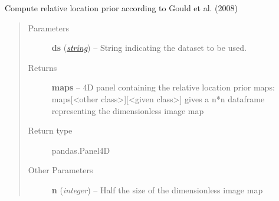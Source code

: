 \documentclass[letterpaper,10pt,english]{sphinxmanual}
\begin{document}
\begin{fulllineitems}
\label{classification:flamingo.classification.features.relativelocation.compute_prior}
Compute relative location prior according to Gould et al. (2008)
\begin{quote}\begin{description}
\item[{Parameters}] \leavevmode
\textbf{ds} (\href{http://docs.python.org/library/string.html\#module-string}{\emph{string}}) -- String indicating the dataset to be used.

\item[{Returns}] \leavevmode
\textbf{maps} --
4D panel containing the relative location prior maps: maps{[}\textless{}other class\textgreater{}{]}{[}\textless{}given class\textgreater{}{]}
gives a n*n dataframe representing the dimensionless image map

\item[{Return type}] \leavevmode
pandas.Panel4D

\item[{Other Parameters}] \leavevmode
\textbf{n} (\emph{integer}) --
Half the size of the dimensionless image map

\end{description}\end{quote}

\end{fulllineitems}

\end{document}
